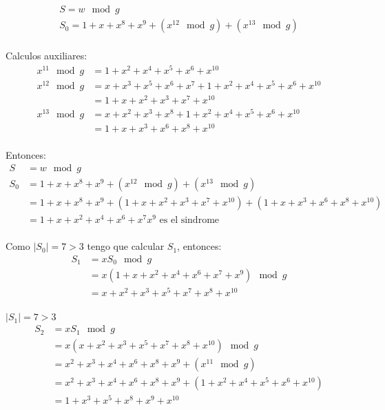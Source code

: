 \documentclass[12pt,a4paper]{article}
\begin{document}
\begin{align*}
    S = w \mod g\\
    S_{0} = 1 + x + x^{8} + x^{9} + (x^{12} \mod g) + (x^{13} \mod g)\\
\end{align*}

Calculos auxiliares:
\begin{align*}
    x^{11} \mod g &= 1 + x^{2} + x^{4} + x^{5} + x^{6} + x^{10}\\
    x^{12} \mod g &= x + x^{3} + x^{5} + x^{6} + x^{7} + 1 + x^{2} + x^{4} + x^{5} + x^{6} + x^{10}\\
    &= 1 + x + x^{2} + x^{3} + x^{7} + x^{10}\\
    x^{13} \mod g &= x + x^{2} + x^{3} + x^{8} + 1 + x^{2} + x^{4} + x^{5} + x^{6} + x^{10}\\
    &= 1 + x + x^{3} + x^{6} + x^{8} + x^{10}\\
\end{align*}

Entonces:
\begin{align*}
    S &= w \mod g\\
    S_{0} &= 1 + x + x^{8} + x^{9} + (x^{12} \mod g) + (x^{13} \mod g)\\
    &= 1 + x + x^{8} + x^{9} + (1 + x + x^{2} + x^{3} + x^{7} + x^{10}) + (1 + x + x^{3} + x^{6} + x^{8} + x^{10})\\
    &= 1 + x + x^{2} + x^{4} + x^{6} + x^{7} x^{9}\,\, \text{es el sindrome}\\
\end{align*}

Como $|S_{0}| = 7 > 3$ tengo que calcular $S_{1}$, entonces:
\begin{align*}
    S_{1} &= xS_{0} \mod g\\
    &= x(1 + x + x^{2} + x^{4} + x^{6} + x^{7} + x^{9}) \mod g\\
    &= x + x^{2} + x^{3} + x^{5} + x^{7} + x^{8} + x^{10}\\
\end{align*}

$|S_{1}| = 7 > 3$
\begin{align*}
    S_{2} &= xS_{1} \mod g\\
    &= x(x + x^{2} + x^{3} + x^{5} + x^{7} + x^{8} + x^{10}) \mod g\\
    &= x^{2} + x^{3} + x^{4} + x^{6} + x^{8} + x^{9} + (x^{11} \mod g)\\
    &= x^{2} + x^{3} + x^{4} + x^{6} + x^{8} + x^{9} + (1 + x^{2} + x^{4} + x^{5} + x^{6} + x^{10})\\
    &= 1 + x^{3} + x^{5} + x^{8} + x^{9} + x^{10}\\
\end{align*}
\end{document}
